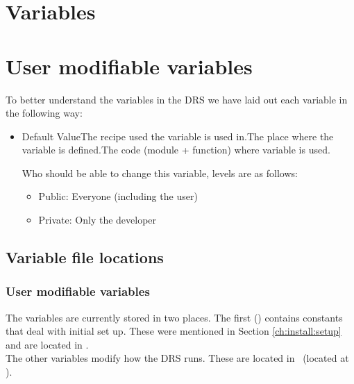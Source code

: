 \ifdevguide
\chapter{Variables}
\label{ch:variables}
\else
\chapter{User modifiable variables}
\label{ch:variables}
\fi


To better understand the variables in the DRS we have laid out each variable in the following way:

\begin{itemize}
\item {}
{Default Value}{The recipe used the variable is used in.}{The place where the variable is defined.}{The code (module + function) where variable is used.}
{
Who should be able to change this variable, levels are as follows:
\begin{itemize}
	\item Public: Everyone (including the user)
	\item Private: Only the developer
\end{itemize}
}

\end{itemize}


\section{Variable file locations}
\label{ch:variables:location}

\ifdevguide
\subsection{User modifiable variables}
\fi

The variables are currently stored in two places. The first (\configtxtfile) contains constants that deal with initial set up. These were mentioned in Section \ref{ch:install:setup} and are located in \configtxtfilepath. \\

\noindent The other variables modify how the DRS runs. These are located in \constantsfile\, (located at \constantsfilepath).  \\


